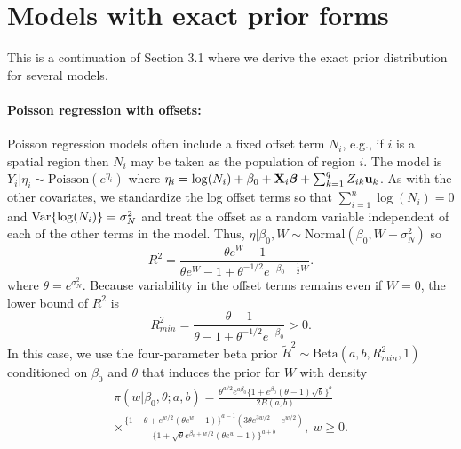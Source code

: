 \documentclass[12pt]{article}
\begin{document}
\section{Models with exact prior forms}
This is a continuation of Section 3.1 where we derive the exact prior distribution for several models.

\paragraph{Poisson regression with offsets:}
Poisson regression models often include a fixed offset term $N_i$, e.g., if $i$ is a spatial region then $N_i$ may be taken as the population of region $i$. The model is $Y_i|\eta_i\sim \mbox{Poisson}(e^{\eta_i})$ where $\eta_i = \log(N_i)+\beta_0 + \mbox{\bf X}_i\mbox{\boldmath $\beta$}+\sum_{k=1}^qZ_{ik}\mbox{\bf u}_k$. As with the other covariates, we standardize the log offset terms so that $\sum_{i=1}^n\log(N_i)=0$ and $\mbox{Var}\{\log(N_i)\}=\sigma^2_N$ and treat the offset as a random variable independent of each of the other terms in the model. Thus, $\eta|\beta_0,W\sim\mbox{Normal}(\beta_0,W+\sigma^2_N)$ so
\begin{equation}
    R^2
    =\frac{\theta e^{W}-1}{\theta e^{W}-1+\theta^{-1/2}e^{-\beta_0-\frac12W}}.
\end{equation}
where $\theta=e^{\sigma^2_N}$. Because variability in the offset terms remains even if $W=0$, the lower bound of $R^2$ is
\begin{equation}
    R^2_{min}
    =\frac{\theta-1}{\theta-1+\theta^{-1/2}e^{-\beta_0}} >0.
\end{equation}
In this case, we use the four-parameter beta prior $\tilde R^2\sim\mbox{Beta}(a,b,R^2_{min},1)$ conditioned on $\beta_0$ and $\theta$ that induces the prior for $W$ with density
\begin{multline}
        \pi(w|\beta_0,\theta; a,b)
    =\frac{\theta^{a/2} e^{a\beta_0}\{1+e^{\beta_0}(\theta-1)\sqrt{\theta}\}^b}{2B(a,b)}\\
    \times \frac{\{1-\theta+e^{w/2}(\theta e^{w}-1)\}^{a-1} (3\theta e^{3w/2}-e^{w/2})}{ \{1+\sqrt{\theta}e^{\beta_0+w/2}(\theta e^{w}-1)\}^{a+b}},\ w\geq0.
\end{multline}
\end{document}
